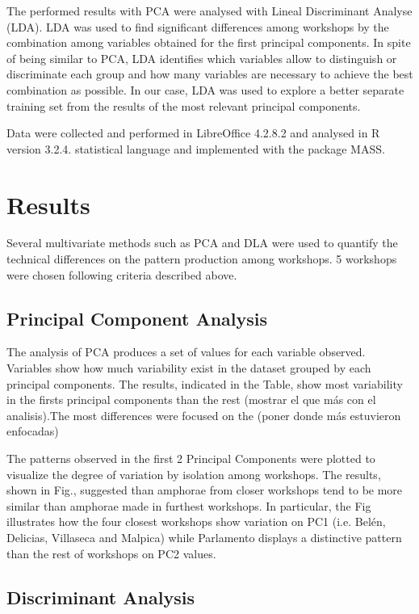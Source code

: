 \documentclass[review]{elsarticle}
\begin{document}
The performed results with PCA were analysed with Lineal Discriminant Analyse (LDA). LDA was used to find significant differences among workshops by the combination among variables obtained for the first principal components. In spite of being similar to PCA, LDA identifies which variables allow to distinguish or discriminate each group and how many variables are necessary to achieve the best combination as possible. In our case, LDA was used to explore a better separate training set from the results of the most relevant principal components. 

Data were collected and performed in LibreOffice 4.2.8.2 and analysed in R version 3.2.4. statistical language and implemented with the package MASS. 


\section{Results}

Several multivariate methods such as PCA and DLA were used to quantify the technical differences on the pattern production among workshops. 5 workshops were chosen following criteria described above. 


\subsection{Principal Component Analysis}

The analysis of PCA produces a set of values for each variable observed. Variables show how much variability exist in the dataset grouped by each principal components. The results, indicated in the Table, show most variability in the firsts principal components than the rest (mostrar el que más con el analisis).The most differences were focused on the (poner donde más estuvieron enfocadas)

The patterns observed in the first 2 Principal Components were plotted to visualize the degree of variation by isolation among workshops. The results, shown in Fig., suggested than amphorae from closer workshops tend to be more similar than amphorae made in furthest workshops. In particular, the Fig illustrates how the four closest workshops show variation on PC1 (i.e. Belén, Delicias, Villaseca and Malpica) while Parlamento displays a distinctive pattern than the rest of workshops on PC2 values. 


\subsection{Discriminant Analysis}
\end{document}
